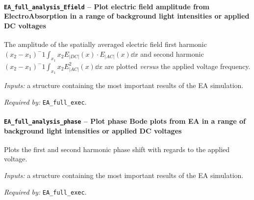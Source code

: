 		\paragraph{\texttt{EA\_full\_analysis\_Efield} -- Plot electric field amplitude from ElectroAbsorption in a range of background light intensities or applied DC voltages}
		The amplitude of the spatially averaged electric field first harmonic $(x_2-x_1)^-1 \int_{x_1}{x_2}E_|DC|(x) \cdot E_|AC|(x) \dd x$ and second harmonic $(x_2-x_1)^-1 \int_{x_1}{x_2} E_|AC|^2(x) \dd x$ are plotted \textsl{versus} the applied voltage frequency.
		
				\textit{Inputs:} a structure containing the most important results of the EA simulation.
		
		
		
		\textit{Required by:} \texttt{EA\_full\_exec}.
		
		
		\paragraph{\texttt{EA\_full\_analysis\_phase} -- Plot phase Bode plots from EA in a range of background light intensities or applied DC voltages}
		Plots the first and second harmonic phase shift with regards to the applied voltage.
		
		\textit{Inputs:} a structure containing the most important results of the EA simulation.
		
		
		
		\textit{Required by:} \texttt{EA\_full\_exec}.
		





